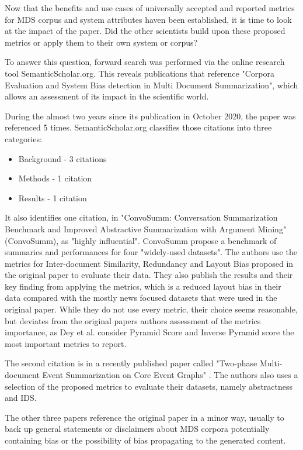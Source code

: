 \documentclass[20_original-paper.tex]{subfiles}
\begin{document}
Now that the benefits and use cases of universally accepted and reported metrics for MDS corpus and system attributes haven been established, it is time to look at the impact of the paper. Did the other scientists build upon these proposed metrics or apply them to their own system or corpus?

To answer this question, forward search was performed via the online research tool SemanticScholar.org.
This reveals publications that reference "Corpora Evaluation and System Bias detection in Multi Document Summarization", which allows an assessment of its impact in the scientific world.

During the almost two years since its publication in October 2020, the paper was referenced 5 times. SemanticScholar.org classifies those citations into three categories: \cite{Cohan2019StructuralSF}

\begin{itemize}
    \item Background - 3 citations
    \item Methods - 1 citation
    \item Results - 1 citation
\end{itemize}

It also identifies one citation, in "ConvoSumm: Conversation Summarization Benchmark and Improved Abstractive Summarization with Argument Mining" (ConvoSumm)\cite{Fabbri2021ConvoSummCS},
as "highly influential"\cite{Valenzuela2015IdentifyingMC}.
ConvoSumm propose a benchmark of summaries and performances for four "widely-used datasets".
The authors use the metrics for Inter-document Similarity, Redundancy and Layout Bias proposed in the original paper to evaluate their data.
They also publish the results and their key finding from applying the metrics, which is a reduced layout bias in their data compared with the mostly news focused datasets that were used in the original paper.
While they do not use every metric, their choice seems reasonable, but deviates from the original papers authors assessment of the metrics importance, as
Dey et al. consider Pyramid Score and Inverse Pyramid score the most important metrics to report.\cite{dey-etal-2020-corpora}

The second citation is in a recently published paper called "Two-phase Multi-document Event Summarization on Core Event Graphs" \cite{Chen2022TwophaseME}. The authors also uses a selection of the proposed metrics to evaluate their datasets, namely abstractness and IDS.

The other three papers reference the original paper in a minor way, usually to back up general statements or disclaimers about MDS corpora potentially containing bias or the possibility of bias propagating to the generated content.\cite{Moro2022SemanticSF,Adams2021WhatsIA,Counseling}
\end{document}

